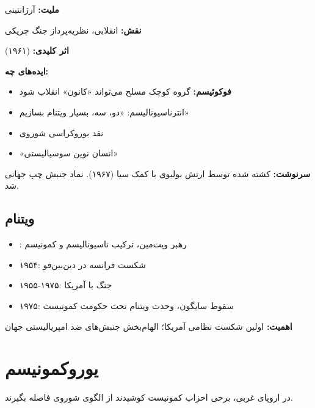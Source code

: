 \begin{personbox}

\textbf{ملیت:} آرژانتینی

\textbf{نقش:} انقلابی، نظریه‌پرداز جنگ چریکی

\textbf{اثر کلیدی:}  (۱۹۶۱)

\mediumspace

\textbf{ایده‌های چه:}
\begin{itemize}[nosep]
    \item \textbf{فوکوئیسم:} گروه کوچک مسلح می‌تواند «کانون» انقلاب شود
    \item انترناسیونالیسم: «دو، سه، بسیار ویتنام بسازیم»
    \item نقد بوروکراسی شوروی
    \item «انسان نوین سوسیالیستی»
\end{itemize}

\mediumspace

\textbf{سرنوشت:} کشته شده توسط ارتش بولیوی با کمک سیا (۱۹۶۷). نماد جنبش چپ جهانی شد.
\end{personbox}

\subsection{ویتنام}

\begin{historybox}
\begin{itemize}[nosep]
    \item {}: رهبر ویت‌مین، ترکیب ناسیونالیسم و کمونیسم
    \item ۱۹۵۴: شکست فرانسه در دین‌بین‌فو
    \item ۱۹۵۵-۱۹۷۵: جنگ با آمریکا
    \item ۱۹۷۵: سقوط سایگون، وحدت ویتنام تحت حکومت کمونیست
\end{itemize}
\textbf{اهمیت:} اولین شکست نظامی آمریکا؛ الهام‌بخش جنبش‌های ضد امپریالیستی جهان
\end{historybox}

\section{یوروکمونیسم}

در اروپای غربی، برخی احزاب کمونیست کوشیدند از الگوی شوروی فاصله بگیرند.

